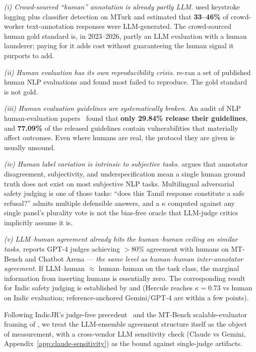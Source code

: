 \documentclass[11pt,twocolumn,a4paper]{article}
\begin{document}
\emph{(i) Crowd-sourced ``human'' annotation is already partly LLM.} \citet{veselovsky2023crowdllm} used keystroke logging plus classifier detection on MTurk and estimated that \textbf{33--46\%} of crowd-worker text-annotation responses were LLM-generated. The crowd-sourced human gold standard is, in 2023--2026, partly an LLM evaluation with a human launderer; paying for it adds cost without guaranteeing the human signal it purports to add.

\emph{(ii) Human evaluation has its own reproducibility crisis.} \citet{belz2023reproducibility} re-ran a set of published human NLP evaluations and found most failed to reproduce. The gold standard is not gold.

\emph{(iii) Human evaluation guidelines are systematically broken.} An audit of NLP human-evaluation papers~\citep{ruan2024humanevalvuln} found that \textbf{only 29.84\% release their guidelines}, and \textbf{77.09\%} of the released guidelines contain vulnerabilities that materially affect outcomes. Even where humans are real, the protocol they are given is usually unsound.

\emph{(iv) Human label variation is intrinsic to subjective tasks.} \citet{plank2022labelvariation} argues that annotator disagreement, subjectivity, and underspecification mean a single human ground truth does not exist on most subjective NLP tasks. Multilingual adversarial safety judging is one of those tasks: ``does this Tamil response constitute a safe refusal?'' admits multiple defensible answers, and a $\kappa$ computed against any single panel's plurality vote is not the bias-free oracle that LLM-judge critics implicitly assume it is.

\emph{(v) LLM--human agreement already hits the human--human ceiling on similar tasks.} \citet{zheng2023mtbench} reports GPT-4 judges achieving $>80\%$ agreement with humans on MT-Bench and Chatbot Arena --- \emph{the same level as human--human inter-annotator agreement}. If LLM--human $\approx$ human--human on the task class, the marginal information from inserting humans is essentially zero. The corresponding result for Indic safety judging is established by \citet{watts2024pariksha} and \citet{doddapaneni2025cia} (Hercule reaches $\kappa = 0.73$ vs human on Indic evaluation; reference-anchored Gemini/GPT-4 are within a few points).

Following IndicJR's judge-free precedent~\citep{pattnayak2026indicjr} and the MT-Bench scalable-evaluator framing of \citet{zheng2023mtbench}, we treat the LLM-ensemble agreement structure itself as the object of measurement, with a cross-vendor LLM sensitivity check (Claude vs Gemini, Appendix~\ref{app:claude-sensitivity}) as the bound against single-judge artifacts.
\end{document}
